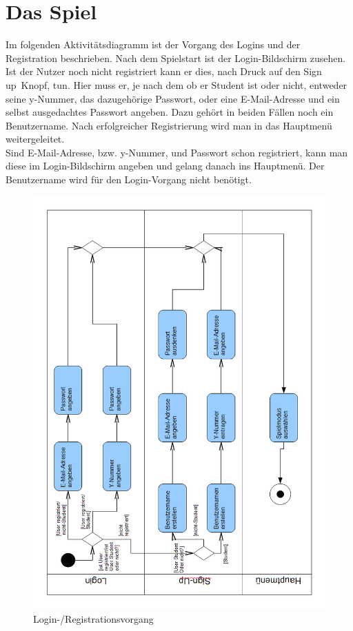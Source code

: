 \section{Das Spiel}
Im folgenden Aktivit\"atsdiagramm ist der Vorgang des Logins und der Registration beschrieben.
Nach dem Spielstart ist der Login-Bildschirm zusehen. 
Ist der Nutzer noch nicht registriert kann er dies, nach Druck auf den \glqq Sign up\grqq~Knopf, tun.
Hier muss er, je nach dem ob er Student ist oder nicht, entweder seine y-Nummer, das dazugeh\"orige Passwort, oder eine E-Mail-Adresse und ein selbst ausgedachtes 
Passwort angeben. Dazu geh\"ort in beiden F\"allen noch ein Benutzername. Nach erfolgreicher Registrierung wird man in das Hauptmen\"u weitergeleitet.\\
Sind E-Mail-Adresse, bzw. y-Nummer, und Passwort schon registriert, kann man diese im Login-Bildschirm angeben und gelang danach ins Hauptmen\"u. Der 
Benutzername wird f\"ur den Login-Vorgang nicht ben\"otigt.
\begin{figure}[ht]
\centering
\includegraphics[width=1\textwidth]{figures/aktiv_RegLog.PNG}
\caption{Login-/Registrationsvorgang}
\end{figure}


